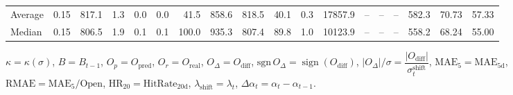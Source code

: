 \begin{threeparttable}
{\begin{tabular}{lrrrrrrrrrrrrrrrrr}
Average &     0.15 & 817.1 &               1.3 &               0.0 &                0.0 &               41.5 &   858.6 & 818.5 &       40.1 &                      0.3 &             17857.9 &         -- &        -- &             -- &            582.3 &           70.73 &                  57.33 \\
 Median &     0.15 & 806.5 &               1.9 &               0.1 &                0.1 &              100.0 &   935.3 & 807.4 &       89.8 &                      1.0 &             10123.9 &         -- &        -- &             -- &            558.2 &           68.24 &                  55.00 \\
\bottomrule
\end{tabular}
}
\begin{tablenotes}\footnotesize
\item $\kappa=\kappa(\sigma)$, $B=B_{t-1}$, $O_p=O_{\text{pred}}$, $O_r=O_{\text{real}}$, $O_\Delta=O_{\text{diff}}$, $\mathrm{sgn}\,O_\Delta=\operatorname{sign}(O_{\text{diff}})$, $|O_\Delta|/\sigma=\dfrac{|O_{\text{diff}}|}{\sigma_t^{\text{shift}}}$, $\mathrm{MAE}_5=\mathrm{MAE}_{5\text{d}}$, $\mathrm{RMAE}= \mathrm{MAE}_5 / \text{Open}$, $\mathrm{HR}_{20}=\mathrm{HitRate}_{20\text{d}}$, 
$\lambda_{\text{shift}}=\lambda_t$, 
$\Delta\alpha_t=\alpha_t-\alpha_{t-1}$.
\end{tablenotes}
\end{threeparttable}
\endgroup

